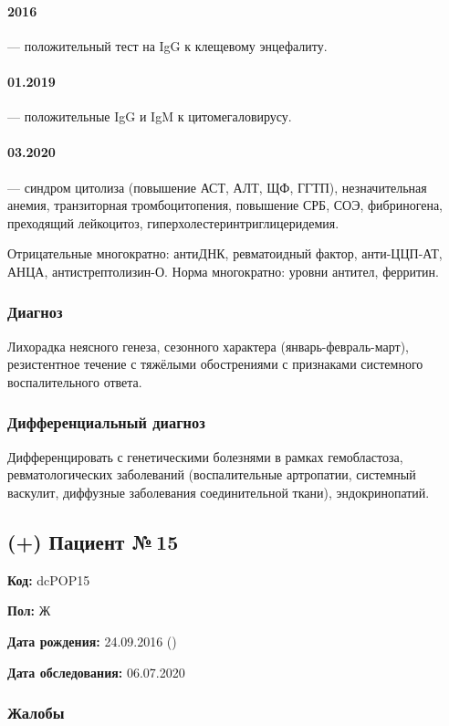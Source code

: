 \documentclass[a4paper,14pt]{extarticle}
\begin{document}
\paragraph{2016} --- положительный тест на IgG к клещевому энцефалиту.
\paragraph{01.2019} --- положительные IgG и IgM к цитомегаловирусу.
\paragraph{03.2020} --- синдром цитолиза (повышение АСТ, АЛТ, ЩФ, ГГТП), незначительная анемия, транзиторная тромбоцитопения, повышение СРБ, СОЭ, фибриногена, преходящий лейкоцитоз, гиперхолестеринтриглицеридемия.

Отрицательные многократно: антиДНК, ревматоидный фактор, анти-ЦЦП-АТ, АНЦА, антистрептолизин-О.
Норма многократно: уровни антител, ферритин.

\subsubsection*{Диагноз}

Лихорадка неясного генеза, сезонного характера (январь-февраль-март), резистентное течение с тяжёлыми обострениями с признаками системного воспалительного ответа.

\subsubsection*{Дифференциальный диагноз}

Дифференцировать с генетическими болезнями в рамках гемобластоза, ревматологических заболеваний (воспалительные артропатии, системный васкулит, диффузные заболевания соединительной ткани), эндокринопатий.

\newpage
\subsection*{(+) Пациент №\,15}

\textbf{Код:} dcPOP15 

\textbf{Пол:} Ж

\textbf{Дата рождения:} 24.09.2016 ()

\textbf{Дата обследования:} 06.07.2020

\subsubsection*{Жалобы}
\end{document}
